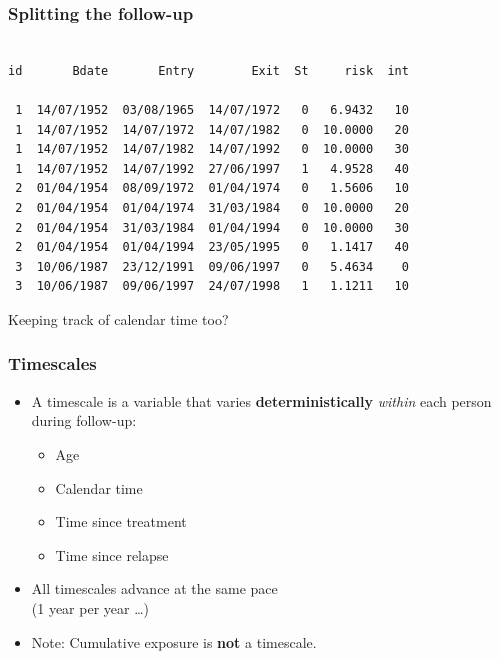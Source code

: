 \begin{frame}[fragile]
  \frametitle{Splitting the follow-up}
{\footnotesize
\renewcommand{\baselinestretch}{0.8}
\begin{verbatim}

id       Bdate       Entry        Exit  St     risk  int

 1  14/07/1952  03/08/1965  14/07/1972   0   6.9432   10
 1  14/07/1952  14/07/1972  14/07/1982   0  10.0000   20
 1  14/07/1952  14/07/1982  14/07/1992   0  10.0000   30
 1  14/07/1952  14/07/1992  27/06/1997   1   4.9528   40
 2  01/04/1954  08/09/1972  01/04/1974   0   1.5606   10
 2  01/04/1954  01/04/1974  31/03/1984   0  10.0000   20
 2  01/04/1954  31/03/1984  01/04/1994   0  10.0000   30
 2  01/04/1954  01/04/1994  23/05/1995   0   1.1417   40
 3  10/06/1987  23/12/1991  09/06/1997   0   5.4634    0
 3  10/06/1987  09/06/1997  24/07/1998   1   1.1211   10
\end{verbatim}
\renewcommand{\baselinestretch}{1.0}
}
 Keeping track of calendar time too?

\end{frame}

\begin{frame}[fragile]
  \frametitle{Timescales}
  \begin{itemize}[<+->]
  \item A timescale is a variable that varies
  \textbf{deterministically} \emph{within} each person during
  follow-up:

  \begin{itemize}[<+->]
  \item Age
  \item Calendar time
  \item Time since treatment
  \item Time since relapse
  \end{itemize}
\item All timescales advance at the same pace \\(1 year per year \ldots)
\item Note: Cumulative exposure is \textbf{not} a timescale.
  \end{itemize}
\end{frame}

